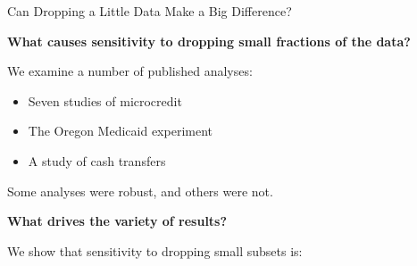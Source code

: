 
\begin{frame}[t]{Can Dropping a Little Data Make a Big Difference?}

\textbf{What causes sensitivity to dropping small fractions of the data?}

\vspace{1em} We examine a number of published analyses:
\begin{itemize}
    \item Seven studies of microcredit \citep{meager2020aggregating}
    \item The Oregon Medicaid experiment \citep{finkelstein2012oregon}
    \item A study of cash transfers \citep{angelucci2009indirect}
\end{itemize}
%
Some analyses were robust, and others were not.

\vspace{1em}
\textbf{What drives the variety of results?}

We show that sensitivity
to dropping small subsets is:



\end{frame}
